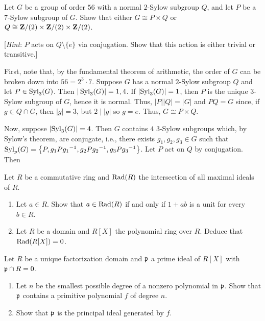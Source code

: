 \begin{problem}
  Let $G$ be a group of order $56$ with a normal $2$-Sylow subgroup $Q$,
  and let $P$ be a $7$-Sylow subgroup of $G$. Show that either $G\cong
  P\times Q$ or $Q\cong\mathbf{Z}/(2)\times\mathbf{Z}/(2)\times\mathbf{Z}/(2)$.

  [\emph{Hint}: $P$ acts on $Q\setminus\{e\}$ via conjugation. Show
  that this action is either trivial or transitive.]
\end{problem}
\begin{solution}
  First, note that, by the fundamental theorem of arithmetic, the order of
  $G$ can be broken down into $56=2^3 \cdot 7$. Suppose $G$ has a normal
  $2$-Sylow subgroup $Q$ and let $P\in\operatorname{Syl}_3(G)$. Then
  $|\operatorname{Syl}_3(G)|=1,4$. If $|{\operatorname{Syl}_3(G)}|=1$, then $P$ is the unique $3$-Sylow
  subgroup of $G$, hence it is normal. Thus, $|P||Q|=|G|$ and $PQ=G$ since,
  if $g\in Q\cap G$, then $|g|=3$, but $2\mid |g|$ so $g=e$. Thus, $G\cong
  P\times Q$.

  Now, suppose $|{\operatorname{Syl}_3(G)}|=4$. Then $G$ contains $4$ $3$-Sylow subgroups
  which, by Sylow's theorem, are conjugate, i.e., there exists
  $g_1,g_2,g_3\in G$ such that
  $\operatorname{Syl}_p(G)=\left\{P,g_1P{g_1}^{-1},g_2P{g_2}^{-1},g_3P{g_3}^{-1}\right\}$. Let
  $P$ act on $Q$ by conjugation. Then
\end{solution}

\begin{problem}
  Let $R$ be a commutative ring and $\operatorname{Rad}(R)$ the intersection of all
  maximal ideals of $R$.
  \begin{enumerate}[label=(\alph*),noitemsep]
  \item Let $a\in R$. Show that $a\in\operatorname{Rad}(R)$ if and only if $1+ab$ is a
    unit for every $b\in R$.
  \item Let $R$ be a domain and $R[X]$ the polynomial ring over
    $R$. Deduce that $\operatorname{Rad}(R[X])=0$.
  \end{enumerate}
\end{problem}
\begin{solution}
\end{solution}

\begin{problem}
  Let $R$ be a unique factorization domain and $\mathfrak{p}$ a prime ideal of $R[X]$
  with $\mathfrak{p}\cap R=0$.
  \begin{enumerate}[label=(\alph*),noitemsep]
  \item Let $n$ be the smallest possible degree of a nonzero polynomial in
    $\mathfrak{p}$. Show that $\mathfrak{p}$ contains a primitive polynomial $f$ of
    degree $n$.
  \item Show that $\mathfrak{p}$ is the principal ideal generated by $f$.
  \end{enumerate}
\end{problem}
\begin{solution}
\end{solution}

